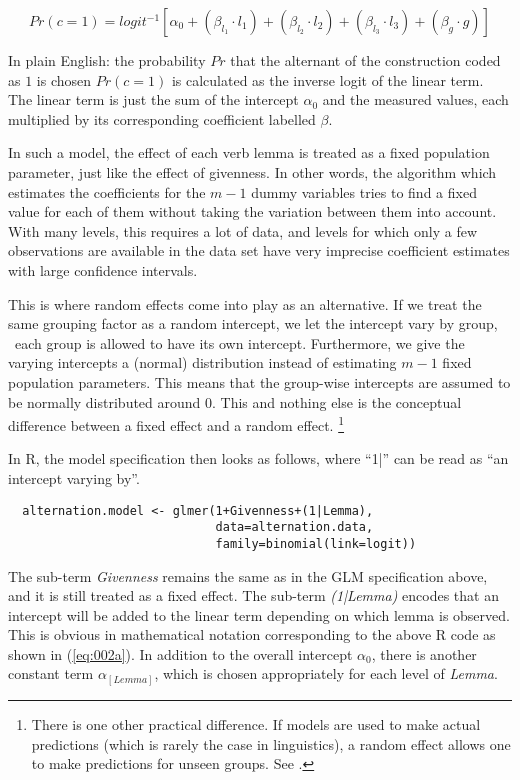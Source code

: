 \begin{equation}
  Pr(c=1)=logit^{-1}\left[\alpha_0+(\beta_{l_1}\cdot l_1)+(\beta_{l_2}\cdot l_2)+(\beta_{l_3}\cdot l_3)+(\beta_{g}\cdot g)\right]
  \label{eq:001a}
\end{equation}

In plain English: the probability $Pr$ that the alternant of the construction coded as $1$ is chosen $Pr(c=1)$ is calculated as the inverse logit of the linear term.
The linear term is just the sum of the intercept $\alpha_0$ and the measured values, each multiplied by its corresponding coefficient labelled $\beta$.

In such a model, the effect of each verb lemma is treated as a fixed population parameter, just like the effect of givenness.
In other words, the algorithm which estimates the coefficients for the $m-1$ dummy variables tries to find a fixed value for each of them without taking the variation between them into account.
With many levels, this requires a lot of data, and levels for which only a few observations are available in the data set have very imprecise coefficient estimates with large confidence intervals.

This is where random effects come into play as an alternative.
If we treat the same grouping factor as a random intercept, we let the intercept vary by group, \ie\ each group is allowed to have its own intercept.
Furthermore, we give the varying intercepts a (normal) distribution instead of estimating $m-1$ fixed population parameters.
This means that the group-wise intercepts are assumed to be normally distributed around $0$.
This and nothing else is the conceptual difference between a fixed effect and a random effect.%
\footnote{There is one other practical difference.
If models are used to make actual predictions (which is rarely the case in linguistics), a random effect allows one to make predictions for unseen groups.
See \citet[272--275]{GelmanHill2006}.}

In R, the model specification then looks as follows, where ``1|'' can be read as ``an intercept varying by''.

\begin{lstlisting}
  alternation.model <- glmer(1+Givenness+(1|Lemma),
                             data=alternation.data,
                             family=binomial(link=logit))
\end{lstlisting}

The sub-term \textit{Givenness} remains the same as in the GLM specification above, and it is still treated as a fixed effect.
The sub-term \textit{(1|Lemma)} encodes that an intercept will be added to the linear term depending on which lemma is observed.
This is obvious in mathematical notation corresponding to the above R code as shown in (\ref{eq:002a}).
In addition to the overall intercept $\alpha_0$, there is another constant term $\alpha_{[Lemma]}$, which is chosen appropriately for each level of \textit{Lemma}.

